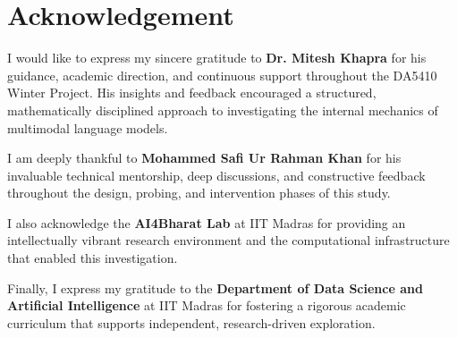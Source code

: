 \documentclass[11pt]{article}
\begin{document}

\clearpage
\thispagestyle{plain}
\normalfont
\normalsize
\parindent=15pt
\parskip=0pt
\raggedbottom

\newpage

\section*{Acknowledgement}

\noindent
I would like to express my sincere gratitude to \textbf{Dr. Mitesh Khapra} for his guidance, academic direction, and continuous support throughout the DA5410 Winter Project. His insights and feedback encouraged a structured, mathematically disciplined approach to investigating the internal mechanics of multimodal language models.

\medskip

I am deeply thankful to \textbf{Mohammed Safi Ur Rahman Khan} for his invaluable technical mentorship, deep discussions, and constructive feedback throughout the design, probing, and intervention phases of this study.

\medskip

I also acknowledge the \textbf{AI4Bharat Lab} at IIT Madras for providing an intellectually vibrant research environment and the computational infrastructure that enabled this investigation.

\medskip

Finally, I express my gratitude to the \textbf{Department of Data Science and Artificial Intelligence} at IIT Madras for fostering a rigorous academic curriculum that supports independent, research-driven exploration.
\end{document}
